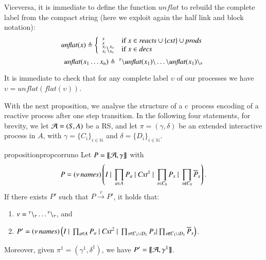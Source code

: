 Viceversa, it is immediate to define the function $\mathit{unflat}$ to rebuild the complete label from the compact string (here we exploit again the half link and block notation):
$$
\mathit{unflat}(x) \triangleq\left\{
\begin{array}{ll}
^{x}_{x} & \mbox{if $x\in \mathit{reacts}\cup\{\mathit{cxt}\}\cup\mathit{prods}$}\\
^{x_i}_{x_i}\backslash^{x_o}_{x_o} & \mbox{if $x\in \mathit{decs}$}\\
\end{array}
\right.
$$
$$
\mathit{unflat}(x_1\dots x_n) \triangleq\ ^{\tau}\backslash \mathit{unflat}(x_1) \backslash \dots \backslash \mathit{unflat}(x_1) \backslash_{\tau}
$$

It is immediate to check that for any complete label $\upsilon$ of our processes we have
$\upsilon = \mathit{unflat}(\mathit{flat}(\upsilon))$.


With the next proposition, we analyse the structure of a c\CNA \ 
process encoding of  a reactive process after one step transition.
In the following four statements, for brevity, we let ${\cal A} = (S, A)$ be a RS, and let  $\pi=(\gamma,\delta)$ be an extended interactive process in $A$, with $\gamma=\{C_i\}_{i\in\mathbb{N}}$ and $\delta=\{D_i\}_{i\in\mathbb{N}}$. 

 \begin{restatable}[Correctness 1]{proposition}{propcorruno}
 \label{prop:corr1}
 Let 
 $P=\llbracket{\cal A},\gamma\rrbracket$ with
$$P  = (\nu\, \mathit{names}) \left(I~|~\prod_{a \in A}P_a ~|~ \mathit{Cxt}^1 ~|~ \prod_{s \in C_0}P_s ~|~ \prod_{s \notin C_0}\overline{P}_s\right).
$$
 If there exists  $P'$  such that $P \xrightarrow{v}P'$,  it holds that:
 \begin{enumerate}
 \item
  $v={}^{\tau} \backslash_{\tau}\dots{}^{\tau} \backslash_{\tau}$, and
  \item 
 $P'= (\nu\, \mathit{names}) \left(I~|~\prod_{a \in A}P_a~|~ \mathit{Cxt}^2 ~|~ \prod_{s \in C_1 \cup D_1}P_s| \prod_{s \notin C_1 \cup D_1}\overline{P}_s\right)$.
 \end{enumerate}
Moreover, given $\pi^1=(\gamma^1,\delta^1)$, we have $P' = \llbracket {\cal A},\gamma^1\rrbracket$.
\end{restatable}
 
